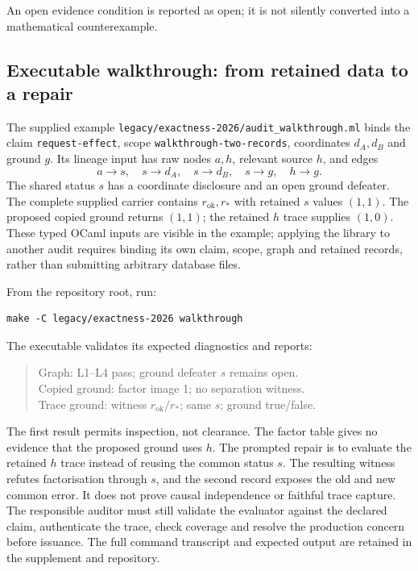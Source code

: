 \documentclass[smallextended,envcountsect,envcountsame,natbib]{svjour3}
\newcommand{\code}[1]{\texttt{#1}}
\begin{document}
An open evidence condition is reported as open; it is not silently converted into a mathematical counterexample.

\subsection{Executable walkthrough: from retained data to a repair}\label{ex:sec:walkthrough}
The supplied example \nolinkurl{legacy/exactness-2026/audit_walkthrough.ml} binds the claim \code{request-effect}, scope \code{walkthrough-two-records}, coordinates $d_A,d_B$ and ground $g$. Its lineage input has raw nodes $a,h$, relevant source $h$, and edges
\[
a\to s,\quad s\to d_A,\quad s\to d_B,
\quad s\to g,\quad h\to g.
\]
The shared status $s$ has a coordinate disclosure and an open ground defeater. The complete supplied carrier contains $r_{\mathrm{ok}},r_*$ with retained $s$ values $(1,1)$. The proposed copied ground returns $(1,1)$; the retained $h$ trace supplies $(1,0)$. These typed OCaml inputs are visible in the example; applying the library to another audit requires binding its own claim, scope, graph and retained records, rather than submitting arbitrary database files.

From the repository root, run:
\begin{verbatim}
make -C legacy/exactness-2026 walkthrough
\end{verbatim}
The executable validates its expected diagnostics and reports:
\begin{quote}\small
Graph: L1--L4 pass; ground defeater $s$ remains open.\\
Copied ground: factor image 1; no separation witness.\\
Trace ground: witness $r_{\mathrm{ok}}/r_*$; same $s$; ground true/false.
\end{quote}
The first result permits inspection, not clearance. The factor table gives no evidence that the proposed ground uses $h$. The prompted repair is to evaluate the retained $h$ trace instead of reusing the common status $s$. The resulting witness refutes factorisation through $s$, and the second record exposes the old and new common error. It does not prove causal independence or faithful trace capture. The responsible auditor must still validate the evaluator against the declared claim, authenticate the trace, check coverage and resolve the production concern before issuance. The full command transcript and expected output are retained in the supplement and repository.
\end{document}
